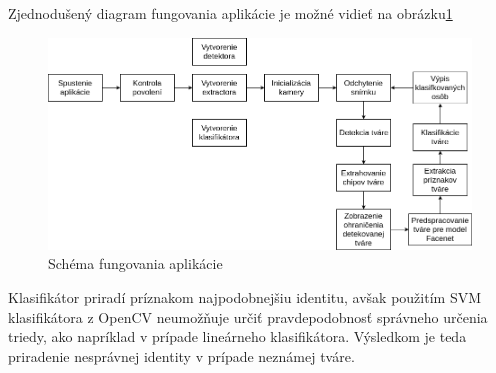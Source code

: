 \indent Zjednodušený diagram fungovania aplikácie je možné vidieť na obrázku\ref{fig:android}
\begin{figure}[H]
	\centering
	\includegraphics[width=1\linewidth]{img/android}
	\caption{Schéma fungovania aplikácie}
	\label{fig:android}
\end{figure}

\indent Klasifikátor priradí príznakom najpodobnejšiu identitu, avšak použitím SVM klasifikátora z OpenCV neumožňuje určiť pravdepodobnosť správneho určenia triedy, ako napríklad v prípade lineárneho klasifikátora.
Výsledkom je teda priradenie nesprávnej identity v prípade neznámej tváre.
